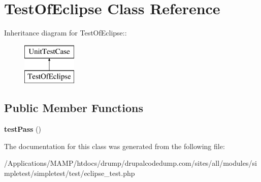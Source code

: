 \hypertarget{class_test_of_eclipse}{
\section{TestOfEclipse Class Reference}
\label{class_test_of_eclipse}
}
Inheritance diagram for TestOfEclipse::\begin{figure}[H]
\begin{center}
\leavevmode
\includegraphics[height=2cm]{class_test_of_eclipse}
\end{center}
\end{figure}
\subsection*{Public Member Functions}
\begin{DoxyCompactItemize}
\item 
\hypertarget{class_test_of_eclipse_a4871a2969bbfa3d2df2d5cf79b6ad9bd}{
{\bfseries testPass} ()}
\label{class_test_of_eclipse_a4871a2969bbfa3d2df2d5cf79b6ad9bd}

\end{DoxyCompactItemize}


The documentation for this class was generated from the following file:\begin{DoxyCompactItemize}
\item 
/Applications/MAMP/htdocs/drump/drupalcodedump.com/sites/all/modules/simpletest/simpletest/test/eclipse\_\-test.php\end{DoxyCompactItemize}

